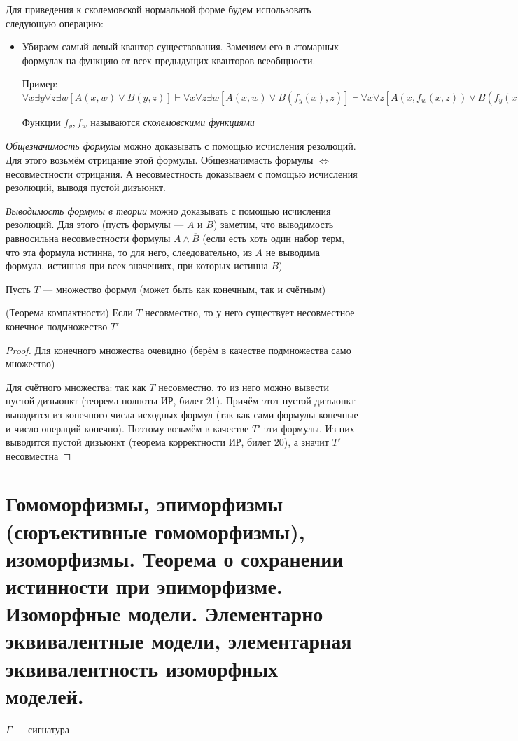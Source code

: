 \documentclass{article}
\begin{document}
Для приведения к сколемовской нормальной форме будем использовать следующую операцию:
\begin{itemize}
	\item Убираем самый левый квантор существования. Заменяем его в атомарных формулах на функцию от всех предыдущих кванторов всеобщности.

	Пример: \(\forall x \exists y \forall z \exists w[A(x, w) \vee B(y, z)] \vdash \forall x \forall z \exists w[A(x, w) \vee B(f_y(x), z)] \vdash \forall x \forall z[A(x, f_w(x, z)) \vee B(f_y(x), z)]\)

	Функции \(f_y, f_w\) называются \textit{сколемовскими функциями}
\end{itemize}

\textit{Общезначимость формулы} можно доказывать с помощью исчисления резолюций. Для этого возьмём отрицание этой формулы. Общезначимасть формулы \(\Leftrightarrow\) несовместности отрицания. А несовместность доказываем с помощью исчисления резолюций, выводя пустой дизъюнкт.

\textit{Выводимость формулы в теории} можно доказывать с помощью исчисления резолюций. Для этого (пусть формулы --- \(A\) и \(B\)) заметим, что выводимость равносильна несовместности формулы \(A \wedge \overline{B}\) (если есть хоть один набор терм, что эта формула истинна, то для него, слеедовательно, из \(A\) не выводима формула, истинная при всех значениях, при которых истинна \(B\))

Пусть \(T\) --- множество формул (может быть как конечным, так и счётным)
\begin{theorem}{(Теорема компактности)}
	Если \(T\) несовместно, то у него существует несовместное конечное подмножество \(T'\)
\end{theorem}

\begin{proof}
    Для конечного множества очевидно (берём в качестве подмножества само множество)

	Для счётного множества: так как \(T\) несовместно, то из него можно вывести пустой дизъюнкт (теорема полноты ИР, билет 21). Причём этот пустой дизъюнкт выводится из конечного числа исходных формул (так как сами формулы конечные и число операций конечно). Поэтому возьмём в качестве \(T'\) эти формулы. Из них выводится пустой дизъюнкт (теорема корректности ИР, билет 20), а значит \(T'\) несовместна
\end{proof}

\section{Гомоморфизмы, эпиморфизмы (сюръективные гомоморфизмы), изоморфизмы. Теорема о сохранении истинности при эпиморфизме. Изоморфные модели. Элементарно эквивалентные модели, элементарная эквивалентность изоморфных моделей.}
\(\Gamma\) --- сигнатура
\end{document}
